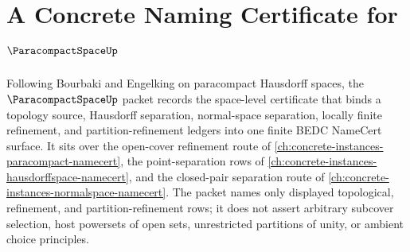 \chapter{A Concrete Naming Certificate for $\ParacompactSpaceUp$}
\label{ch:concrete-instances-paracompact-space-namecert}

Following Bourbaki and Engelking on paracompact Hausdorff spaces, the $\ParacompactSpaceUp$ packet records the space-level certificate that binds a topology source, Hausdorff separation, normal-space separation, locally finite refinement, and partition-refinement ledgers into one finite BEDC NameCert surface. It sits over the open-cover refinement route of \autoref{ch:concrete-instances-paracompact-namecert}, the point-separation rows of \autoref{ch:concrete-instances-hausdorffspace-namecert}, and the closed-pair separation route of \autoref{ch:concrete-instances-normalspace-namecert}. The packet names only displayed topological, refinement, and partition-refinement rows; it does not assert arbitrary subcover selection, host powersets of open sets, unrestricted partitions of unity, or ambient choice principles.

